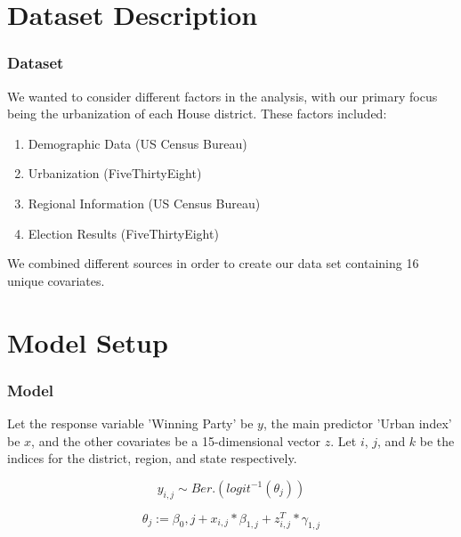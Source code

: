 \documentclass{beamer}
\begin{document}
\section{Dataset Description}
\begin{frame}
\frametitle{Dataset}
We wanted to consider different factors in the analysis, with our primary focus being the urbanization of each House district. These factors included: 
\begin{enumerate}
  \item Demographic Data (US Census Bureau)
  \item Urbanization (FiveThirtyEight)
  \item Regional Information (US Census Bureau)
  \item Election Results (FiveThirtyEight)
\end{enumerate}
We combined different sources in order to create our data set containing 16 unique covariates.
\end{frame}  






\section{Model Setup}


\begin{frame}
\frametitle{Model}
Let the response variable 'Winning Party' be \(y\), the main predictor 'Urban index' be \(x\), and the other covariates be a 15-dimensional vector \(z\). Let \(i\), \(j\), and \(k\) be the indices for the district, region, and state respectively. 

\[y_{i, j} \sim Ber.(logit^{-1}(\theta_{j}))\]

\[\theta_j := \beta_0, j + x_{i,j} * \beta_{1,j}  + z_{i, j}^T * \gamma_{1,j}\]



\end{frame}
\end{document}

